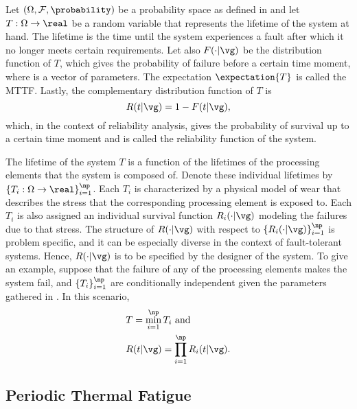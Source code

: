 \newcommand{\mean}{\mu}
\newcommand{\scale}{\eta}
\newcommand{\shape}{\beta}

Let $(\Omega, \mathcal{F}, \probability)$ be a probability space as defined in
 and let $T: \Omega \to \real$ be a random variable
that represents the lifetime of the system at hand. The lifetime is the time
until the system experiences a fault after which it no longer meets certain
requirements. Let also $F(\cdot | \vg)$ be the distribution function of $T$,
which gives the probability of failure before a certain time moment, where \vg
is a vector of parameters. The expectation $\expectation{T}$ is called the
\ac{MTTF}. Lastly, the complementary distribution function of $T$ is
\[
  R(t | \vg) = 1 - F(t | \vg),
\]
which, in the context of reliability analysis, gives the probability of survival
up to a certain time moment and is called the reliability function of the
system.

The lifetime of the system $T$ is a function of the lifetimes of the \np
processing elements that the system is composed of. Denote these individual
lifetimes by $\{ T_i: \Omega \to \real \}_{i = 1}^\np$. Each $T_i$ is
characterized by a physical model of wear \cite{jedec2016} that describes the
stress that the corresponding processing element is exposed to. Each $T_i$ is
also assigned an individual survival function $R_i(\cdot | \vg)$ modeling the
failures due to that stress. The structure of $R(\cdot | \vg)$ with respect to
$\{ R_i(\cdot | \vg) \}_{i = 1}^\np$ is problem specific, and it can be
especially diverse in the context of fault-tolerant systems. Hence, $R(\cdot |
\vg)$ is to be specified by the designer of the system. To give an example,
suppose that the failure of any of the \np processing elements makes the system
fail, and $\{ T_i \}_{i = 1}^\np$ are conditionally independent given the
parameters gathered in \vg. In this scenario,
\begin{align*}
  & T = \min_{i = 1}^\np T_i \text{ and} \\
  & R(t | \vg) = \prod_{i = 1}^\np R_i(t | \vg).
\end{align*}

\subsection{Periodic Thermal Fatigue}

